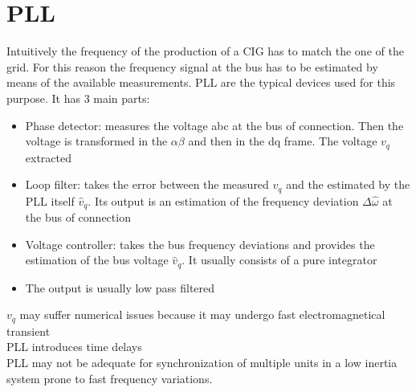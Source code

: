 \documentclass[11pt, a4paper]{article}
\begin{document}
\section{PLL}
Intuitively the frequency of the production of a CIG has to match the one of the grid. For this reason the frequency signal at the bus has to be estimated by means of the available measurements. PLL are the typical devices used for this purpose. It has 3 main parts:
\begin{itemize}
  \item Phase detector: measures the voltage abc at the bus of connection. Then the voltage is transformed in the $\alpha \beta $ and then in the dq frame. The voltage $v_q$ extracted
  \item Loop filter: takes the error between the measured $v_q$ and the estimated by the PLL itself $\hat{v}_q$. Its output is an estimation of the frequency deviation $\Delta \hat{\omega}$ at the bus of connection
  \item Voltage controller: takes the bus frequency deviations and provides the estimation of the bus voltage $\hat{v}_q$. It usually consists of a pure integrator 
  \item The output is usually low pass filtered 
\end{itemize}

$v_q$ may suffer numerical issues because it may undergo fast electromagnetical transient\\
PLL introduces time delays\\
PLL may not be adequate for synchronization of multiple units in a low inertia system prone to fast frequency variations.
\end{document}
